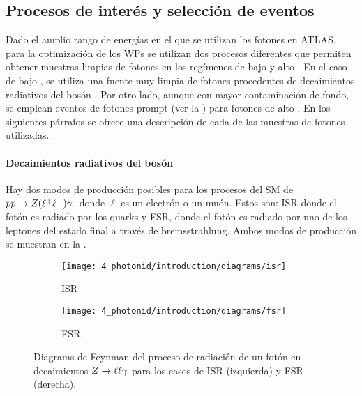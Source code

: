 \subsection{Procesos de interés y selección de eventos}
\label{subsec:pid_ss:pid:event_selection}

Dado el amplio rango de energías en el que se utilizan los fotones en \ac{ATLAS}, para la optimización de los \acp{WP} se utilizan dos procesos diferentes que permiten obtener muestras limpias de fotones en los regímenes de bajo y alto \pt. En el caso de bajo \pt, se utiliza una fuente muy limpia de fotones procedentes de decaimientos radiativos del bosón \Zboson. Por otro lado, aunque con mayor contaminación de fondo, se emplean eventos de fotones prompt (ver la \Sect{\ref{subsec:theory:sm:prompt_photon}}) para fotones de alto \pt. En los siguientes párrafos se ofrece una descripción de cada de las muestras de fotones utilizadas.


\paragraph{Decaimientos radiativos del bosón \Zboson}

Hay dos modos de producción posibles para los procesos del \ac{SM} de \(pp\rightarrow Z(\ell^{+} \ell^{-})\gamma\), donde \(\ell\) es un electrón o un muón. Estos son: \acf{ISR} donde el fotón es radiado por los quarks y \acf{FSR}, donde el fotón es radiado por uno de los leptones del estado final a través de bremsstrahlung. Ambos modos de producción se muestran en la \Fig{\ref{fig:pid_ss:event_selection:fsr_isr}}.


\begin{figure}[ht!]
    \centering
    \begin{subfigure}[h]{0.49\linewidth}
        \centering
        \texttt{[image: 4\_photonid/introduction/diagrams/isr]}
        \caption{\Acf{ISR}}
    \end{subfigure}
    \hfill
    \begin{subfigure}[h]{0.49\linewidth}
        \centering
        \texttt{[image: 4\_photonid/introduction/diagrams/fsr]}
        \caption{\Acf{FSR}}
    \end{subfigure}
    \caption{Diagrams de Feynman del proceso de radiación de un fotón en decaimientos \(Z\rightarrow\ell\ell\gamma\) para los casos de \ac{ISR} (izquierda) y \ac{FSR} (derecha).}
    \label{fig:pid_ss:event_selection:fsr_isr}
\end{figure}


